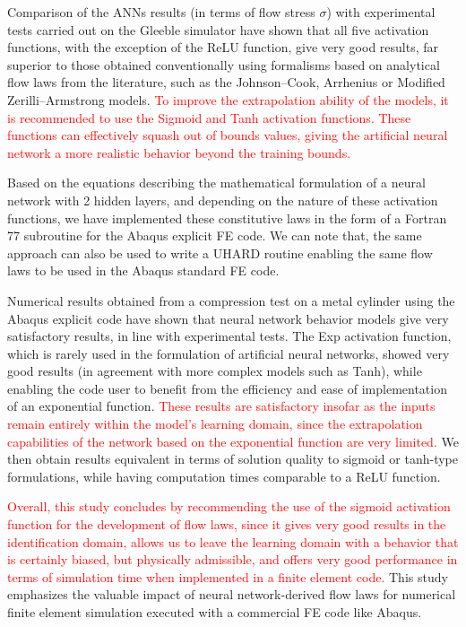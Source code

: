 \documentclass[algorithms,article,submit,pdftex,oneauthors]{Definitions/mdpi}
\begin{document}
Comparison of the ANNs results (in terms of flow stress $\sigma$) with experimental tests carried out on the Gleeble simulator have shown that all five activation functions, with the exception of the ReLU function, give very good results, far superior to those obtained conventionally using formalisms based on analytical flow laws from the literature, such as the Johnson--Cook, Arrhenius or Modified Zerilli--Armstrong models.
\textcolor{red}{To improve the extrapolation ability of the models, it is recommended to use the Sigmoid and Tanh activation functions. These functions can effectively squash out of bounds values, giving the artificial neural network a more realistic behavior beyond the training bounds.}

Based on the equations describing the mathematical formulation of a neural network with 2 hidden layers, and depending on the nature of these activation functions, we have implemented these constitutive laws in the form of a Fortran 77 subroutine for the Abaqus explicit FE code.
We can note that, the same approach can also be used to write a UHARD routine enabling the same flow laws to be used in the Abaqus standard FE code.

Numerical results obtained from a compression test on a metal cylinder using the Abaqus explicit code have shown that neural network behavior models give very satisfactory results, in line with experimental tests.
The Exp activation function, which is rarely used in the formulation of artificial neural networks, showed very good results (in agreement with more complex models such as Tanh), while enabling the code user to benefit from the efficiency and ease of implementation of an exponential function. \textcolor{red}{These results are satisfactory insofar as the inputs remain entirely within the model's learning domain, since the extrapolation capabilities of the network based on the exponential function are very limited.}
We then obtain results equivalent in terms of solution quality to sigmoid or tanh-type formulations, while having computation times comparable to a ReLU function.

\textcolor{red}{Overall, this study concludes by recommending the use of the sigmoid activation function for the development of flow laws, since it gives very good results in the identification domain, allows us to leave the learning domain with a behavior that is certainly biased, but physically admissible, and offers very good performance in terms of simulation time when implemented in a finite element code.}
This study emphasizes the valuable impact of neural network-derived flow laws for numerical finite element simulation executed with a commercial FE code like Abaqus.
\end{document}

